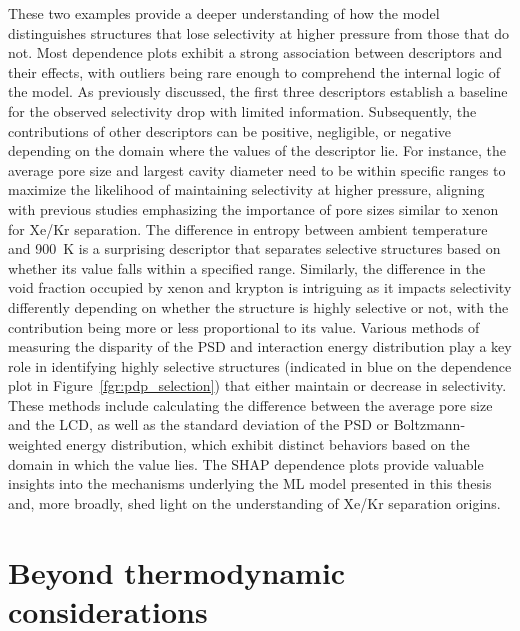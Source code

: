 \documentclass[main]{subfiles}
\begin{document}
These two examples provide a deeper understanding of how the model distinguishes structures that lose selectivity at higher pressure from those that do not. Most dependence plots exhibit a strong association between descriptors and their effects, with outliers being rare enough to comprehend the internal logic of the model. As previously discussed, the first three descriptors establish a baseline for the observed selectivity drop with limited information. Subsequently, the contributions of other descriptors can be positive, negligible, or negative depending on the domain where the values of the descriptor lie. For instance, the average pore size and largest cavity diameter need to be within specific ranges to maximize the likelihood of maintaining selectivity at higher pressure, aligning with previous studies emphasizing the importance of pore sizes similar to xenon for Xe/Kr separation. The difference in entropy between ambient temperature and \SI{900}{\kelvin} is a surprising descriptor that separates selective structures based on whether its value falls within a specified range. Similarly, the difference in the void fraction occupied by xenon and krypton is intriguing as it impacts selectivity differently depending on whether the structure is highly selective or not, with the contribution being more or less proportional to its value. Various methods of measuring the disparity of the PSD and interaction energy distribution play a key role in identifying highly selective structures (indicated in blue on the dependence plot in Figure~\ref{fgr:pdp_selection}) that either maintain or decrease in selectivity. These methods include calculating the difference between the average pore size and the LCD, as well as the standard deviation of the PSD or Boltzmann-weighted energy distribution, which exhibit distinct behaviors based on the domain in which the value lies. The SHAP dependence plots provide valuable insights into the mechanisms underlying the ML model presented in this thesis and, more broadly, shed light on the understanding of Xe/Kr separation origins.

\section{Beyond thermodynamic considerations}
\end{document}
